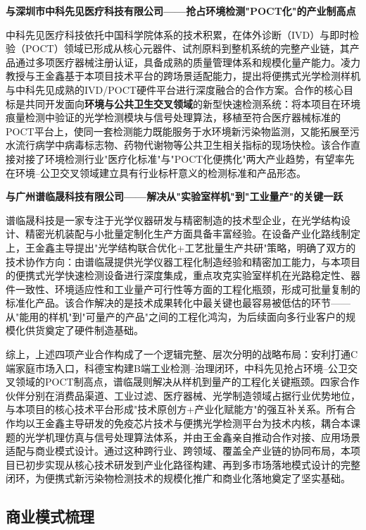 \documentclass[12pt,a4paper]{article}
\begin{document}
\textbf{与深圳市中科先见医疗科技有限公司——抢占环境检测"POCT化"的产业制高点}

中科先见医疗科技依托中国科学院体系的技术积累，在体外诊断（IVD）与即时检验（POCT）领域已形成从核心元器件、试剂原料到整机系统的完整产业链，其产品通过多项医疗器械注册认证，具备成熟的质量管理体系和规模化量产能力。凌力教授与王金鑫基于本项目技术平台的跨场景适配能力，提出将便携式光学检测样机与中科先见成熟的IVD/POCT硬件平台进行深度融合的合作方案。合作的核心目标是共同开发面向\textbf{环境与公共卫生交叉领域}的新型快速检测系统：将本项目在环境痕量检测中验证的光学检测模块与信号处理算法，移植至符合医疗器械标准的POCT平台上，使同一套检测能力既能服务于水环境新污染物监测，又能拓展至污水流行病学中病毒标志物、药物代谢物等公共卫生相关指标的现场快检。该合作直接对接了环境检测行业"医疗化标准"与"POCT化便携化"两大产业趋势，有望率先在环境--公卫交叉领域建立具有行业标杆意义的检测标准和产品形态。

\textbf{与广州谱临晟科技有限公司——解决从"实验室样机"到"工业量产"的关键一跃}

谱临晟科技是一家专注于光学仪器研发与精密制造的技术型企业，在光学结构设计、精密光机装配与小批量定制化生产方面具备丰富经验。在设备产业化路线制定上，王金鑫主导提出"光学结构联合优化+工艺批量生产共研"策略，明确了双方的技术协作方向：由谱临晟提供光学仪器工程化制造经验和精密加工能力，与本项目的便携式光学快速检测设备进行深度集成，重点攻克实验室样机在光路稳定性、器件一致性、环境适应性和工业量产可行性等方面的工程化瓶颈，形成可批量复制的标准化产品。该合作解决的是技术成果转化中最关键也最容易被低估的环节——从"能用的样机"到"可量产的产品"之间的工程化鸿沟，为后续面向多行业客户的规模化供货奠定了硬件制造基础。

综上，上述四项产业合作构成了一个逻辑完整、层次分明的战略布局：安利打通C端家庭市场入口，科德宝构建B端工业检测--治理闭环，中科先见抢占环境--公卫交叉领域的POCT制高点，谱临晟则解决从样机到量产的工程化关键瓶颈。四家合作伙伴分别在消费品渠道、工业过滤、医疗器械、光学制造领域占据行业优势地位，与本项目的核心技术平台形成"技术原创方+产业化赋能方"的强互补关系。所有合作均以王金鑫主导研发的免疫芯片技术与便携光学检测平台为技术内核，耦合本课题的光学机理仿真与信号处理算法体系，并由王金鑫亲自推动合作对接、应用场景适配与商业模式设计。通过这种跨行业、跨领域、覆盖全产业链的协同布局，本项目已初步实现从核心技术研发到产业化路径构建、再到多市场落地模式设计的完整闭环，为便携式新污染物检测技术的规模化推广和商业化落地奠定了坚实基础。

\subsection{商业模式梳理}
\end{document}
